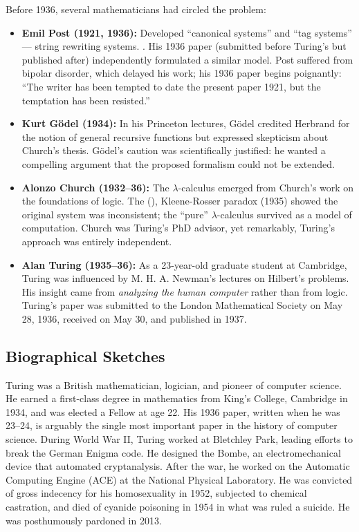 Before 1936, several mathematicians had circled the problem:
\begin{itemize}
\item \textbf{Emil Post (1921, 1936):} Developed ``canonical systems'' and ``tag systems'' --- string rewriting systems. \cite{church1936}. His 1936 paper (submitted before Turing's but published after) independently formulated a similar model. Post suffered from bipolar disorder, which delayed his work; his 1936 paper begins poignantly: ``The writer has been tempted to date the present paper 1921, but the temptation has been resisted.''

\item \textbf{Kurt G\"odel (1934):} In his Princeton lectures, G\"odel credited Herbrand for the notion of general recursive functions but expressed skepticism about Church's thesis. G\"odel's caution was scientifically justified: he wanted a compelling argument that the proposed formalism could not be extended.

\item \textbf{Alonzo Church (1932--36):} The $\lambda$-calculus emerged from Church's work on the foundations of logic. The (\cite{kleenerosser1935}), Kleene-Rosser paradox (1935) showed the original system was inconsistent; the ``pure'' $\lambda$-calculus survived as a model of computation. Church was Turing's PhD advisor, yet remarkably, Turing's approach was entirely independent.

\item \textbf{Alan Turing (1935--36):} As a 23-year-old graduate student at Cambridge, Turing was influenced by M. H. A. Newman's lectures on Hilbert's problems. His insight came from \emph{analyzing the human computer} rather than from logic. Turing's paper was submitted to the London Mathematical Society on May 28, 1936, received on May 30, and published in 1937.
\end{itemize}

\subsection*{Biographical Sketches}

Turing was a British mathematician, logician, and pioneer of computer science. He earned a first-class degree in mathematics from King's College, Cambridge in 1934, and was elected a Fellow at age 22. His 1936 paper, written when he was 23--24, is arguably the single most important paper in the history of computer science. During World War II, Turing worked at Bletchley Park, leading efforts to break the German Enigma code. He designed the Bombe, an electromechanical device that automated cryptanalysis. After the war, he worked on the Automatic Computing Engine (ACE) at the National Physical Laboratory. He was convicted of gross indecency for his homosexuality in 1952, subjected to chemical castration, and died of cyanide poisoning in 1954 in what was ruled a suicide. He was posthumously pardoned in 2013.

